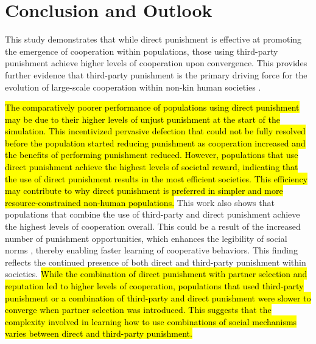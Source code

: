 \documentclass[sn-aps,numbered]{sn-jnl}%
\theoremstyle{thmstyleone}%
\theoremstyle{thmstyletwo}%
\theoremstyle{thmstylethree}%
\begin{document}
\section{Conclusion and Outlook}

This study demonstrates that while direct punishment is effective at promoting the emergence of cooperation within populations, those using third-party punishment achieve higher levels of cooperation upon convergence. This provides further evidence that third-party punishment is the primary driving force for the evolution of large-scale cooperation within non-kin human societies \citep{Redhead2021, silly_rules_ssd, coop_sizes_punish_partner_choice_rep, boyd1992punishment}.

\hl{The comparatively poorer performance of populations using direct punishment may be due to their higher levels of unjust punishment at the start of the simulation. This incentivized pervasive defection that could not be fully resolved before the population started reducing punishment as cooperation increased and the benefits of performing punishment reduced. However, populations that use direct punishment achieve the highest levels of societal reward, indicating that the use of direct punishment results in the most efficient societies. This efficiency may contribute to why direct punishment is preferred in simpler and more resource-constrained non-human populations.} This work also shows that populations that combine the use of third-party and direct punishment achieve the highest levels of cooperation overall. This could be a result of the increased number of punishment opportunities, which enhances the legibility of social norms \citep{legible_normativity_hadfield}, thereby enabling faster learning of cooperative behaviors. This finding reflects the continued presence of both direct and third-party punishment within societies.
%
\hl{While the combination of direct punishment with partner selection and reputation led to higher levels of cooperation, populations that used third-party punishment or a combination of third-party and direct punishment were slower to converge when partner selection was introduced. This suggests that the complexity involved in learning how to use combinations of social mechanisms varies between direct and third-party punishment.}
\end{document}
